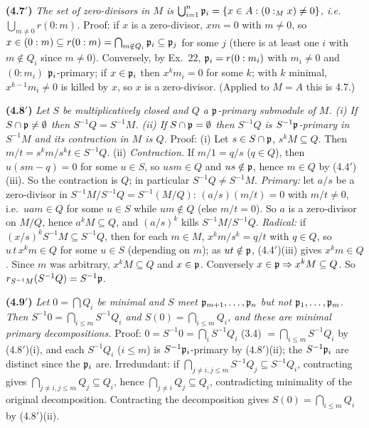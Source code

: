 \documentclass[11pt]{article}
\begin{document}
\textbf{(4.7$'$)} \emph{The set of zero-divisors in $M$ is $\bigcup_{i=1}^n\mathfrak p_i=\{x\in A:(0:_Mx)\ne0\}$, i.e.\ $\bigcup_{m\ne0}r(0:m)$.}
Proof: if $x$ is a zero-divisor, $xm=0$ with $m\ne0$, so $x\in(0:m)\subseteq r(0:m)=\bigcap_{m\notin Q_i}\mathfrak p_i\subseteq\mathfrak p_j$ for some $j$ (there is at least one $i$ with $m\notin Q_i$ since $m\ne0$). Conversely, by Ex.~22, $\mathfrak p_i=r(0:m_i)$ with $m_i\ne0$ and $(0:m_i)$ $\mathfrak p_i$-primary; if $x\in\mathfrak p_i$ then $x^km_i=0$ for some $k$; with $k$ minimal, $x^{k-1}m_i\ne0$ is killed by $x$, so $x$ is a zero-divisor. (Applied to $M=A$ this is 4.7.)

\textbf{(4.8$'$)} \emph{Let $S$ be multiplicatively closed and $Q$ a $\mathfrak p$-primary submodule of $M$. (i) If $S\cap\mathfrak p\ne\emptyset$ then $S^{-1}Q=S^{-1}M$. (ii) If $S\cap\mathfrak p=\emptyset$ then $S^{-1}Q$ is $S^{-1}\mathfrak p$-primary in $S^{-1}M$ and its contraction in $M$ is $Q$.}
Proof: (i) Let $s\in S\cap\mathfrak p$, $s^kM\subseteq Q$. Then $m/t=s^km/s^kt\in S^{-1}Q$. (ii) \emph{Contraction.} If $m/1=q/s$ ($q\in Q$), then $u(sm-q)=0$ for some $u\in S$, so $usm\in Q$ and $us\notin\mathfrak p$, hence $m\in Q$ by (4.4$'$)(iii). So the contraction is $Q$; in particular $S^{-1}Q\ne S^{-1}M$. \emph{Primary:} let $a/s$ be a zero-divisor in $S^{-1}M/S^{-1}Q=S^{-1}(M/Q)$: $(a/s)(m/t)=0$ with $m/t\ne0$, i.e.\ $uam\in Q$ for some $u\in S$ while $um\notin Q$ (else $m/t=0$). So $a$ is a zero-divisor on $M/Q$, hence $a^kM\subseteq Q$, and $(a/s)^k$ kills $S^{-1}M/S^{-1}Q$. \emph{Radical:} if $(x/s)^kS^{-1}M\subseteq S^{-1}Q$, then for each $m\in M$, $x^km/s^k=q/t$ with $q\in Q$, so $u\,t\,x^km\in Q$ for some $u\in S$ (depending on $m$); as $ut\notin\mathfrak p$, (4.4$'$)(iii) gives $x^km\in Q$. Since $m$ was arbitrary, $x^kM\subseteq Q$ and $x\in\mathfrak p$. Conversely $x\in\mathfrak p\Rightarrow x^kM\subseteq Q$. So $r_{S^{-1}M}(S^{-1}Q)=S^{-1}\mathfrak p$.

\textbf{(4.9$'$)} \emph{Let $0=\bigcap Q_i$ be minimal and $S$ meet $\mathfrak p_{m+1},\dots,\mathfrak p_n$ but not $\mathfrak p_1,\dots,\mathfrak p_m$. Then $S^{-1}0=\bigcap_{i\le m}S^{-1}Q_i$ and $S(0)=\bigcap_{i\le m}Q_i$, and these are minimal primary decompositions.}
Proof: $0=S^{-1}0=\bigcap_iS^{-1}Q_i$ (3.4) $=\bigcap_{i\le m}S^{-1}Q_i$ by (4.8$'$)(i), and each $S^{-1}Q_i$ ($i\le m$) is $S^{-1}\mathfrak p_i$-primary by (4.8$'$)(ii); the $S^{-1}\mathfrak p_i$ are distinct since the $\mathfrak p_i$ are. Irredundant: if $\bigcap_{j\ne i,j\le m}S^{-1}Q_j\subseteq S^{-1}Q_i$, contracting gives $\bigcap_{j\ne i,j\le m}Q_j\subseteq Q_i$, hence $\bigcap_{j\ne i}Q_j\subseteq Q_i$, contradicting minimality of the original decomposition. Contracting the decomposition gives $S(0)=\bigcap_{i\le m}Q_i$ by (4.8$'$)(ii).
\end{document}
